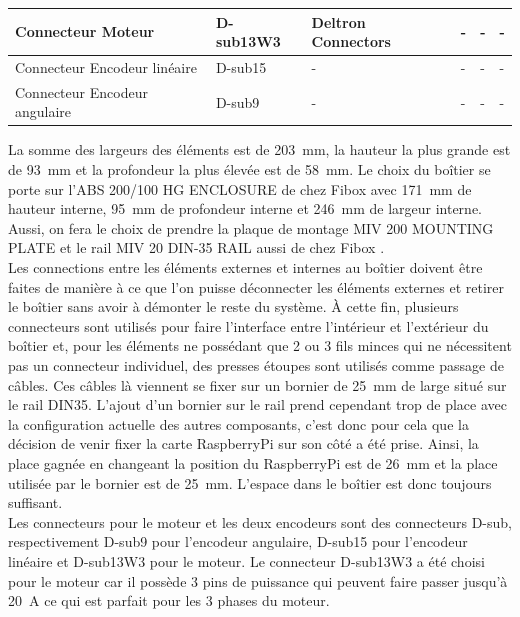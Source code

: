 \begin{table}[H]
{\begin{tabular}{|l|l|l|l|l|l|}
            Connecteur Moteur             & D-sub13W3           & Deltron Connectors \cite{Deltron} & -                & -                & -                   \\ \hline
            Connecteur Encodeur linéaire  & D-sub15             & -                                 & -                & -                & -                   \\ \hline
            Connecteur Encodeur angulaire & D-sub9              & -                                 & -                & -                & -                   \\ \hline
        \end{tabular}%
    }
\end{table}

La somme des largeurs des éléments est de 203~mm, la hauteur la plus grande est de 93~mm et la profondeur la plus élevée est de 58~mm. Le choix
du boîtier se porte sur l'ABS 200/100 HG ENCLOSURE de chez Fibox \cite{Fibox} avec 171~mm de hauteur interne, 95~mm de profondeur interne et
246~mm de largeur interne. Aussi, on fera le choix de prendre la plaque de montage MIV 200 MOUNTING PLATE et le rail MIV 20 DIN-35 RAIL aussi
de chez Fibox \cite{Fibox}.\\

Les connections entre les éléments externes et internes au boîtier doivent être faites de manière à ce que l'on puisse déconnecter les éléments
externes et retirer le boîtier sans avoir à démonter le reste du système. À cette fin, plusieurs connecteurs sont utilisés pour faire l'interface
entre l'intérieur et l'extérieur du boîtier et, pour les éléments ne possédant que 2 ou 3 fils minces qui ne nécessitent pas un connecteur
individuel, des presses étoupes sont utilisés comme passage de câbles. Ces câbles là viennent se fixer sur un bornier de 25~mm de large situé
sur le rail DIN35. L'ajout d'un bornier sur le rail prend cependant trop de place avec la configuration actuelle des autres composants, c'est
donc pour cela que la décision de venir fixer la carte RaspberryPi sur son côté a été prise. Ainsi, la place gagnée en changeant la position du
RaspberryPi est de 26~mm et la place utilisée par le bornier est de 25~mm. L'espace dans le boîtier est donc toujours suffisant.\\

Les connecteurs pour le moteur et les deux encodeurs sont des connecteurs D-sub, respectivement D-sub9 pour l'encodeur angulaire, D-sub15 pour
l'encodeur linéaire et D-sub13W3 pour le moteur. Le connecteur D-sub13W3 a été choisi pour le moteur car il possède 3 pins de puissance qui
peuvent faire passer jusqu'à 20~A ce qui est parfait pour les 3 phases du moteur.

